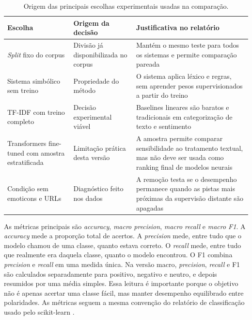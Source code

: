 \documentclass[11pt,a4paper]{article}
\newcommand{\altrowcolors}{\rowcolors{2}{black!4}{white}}
\newcommand{\clearrowcolors}{\rowcolors{2}{}{}}
\begin{document}
\begin{table}[h]
\small
\centering
\renewcommand{\arraystretch}{1.16}
\altrowcolors
\begin{tabularx}{\linewidth}{@{}L{3.1cm}L{3.2cm}Y@{}}
\toprule
\textbf{Escolha} & \textbf{Origem da decisão} & \textbf{Justificativa no relatório} \\
\midrule
\emph{Split} fixo do corpus & Divisão já disponibilizada no corpus & Mantém o mesmo teste para todos os sistemas e permite comparação pareada \citep{ribeiro2016sentibench,dror2017replicability} \\
\addlinespace[0.3em]
Sistema simbólico sem treino & Propriedade do método & O sistema aplica léxico e regras, sem aprender pesos supervisionados a partir do treino \\
\addlinespace[0.3em]
TF-IDF com treino completo & Decisão experimental viável & Baselines lineares são baratos e tradicionais em categorização de texto e sentimento \citep{salton1988termweighting,pang2002thumbs,joachims1998text} \\
\addlinespace[0.3em]
Transformers fine-tuned com amostra estratificada & Limitação prática desta versão & A amostra permite comparar sensibilidade ao tratamento textual, mas não deve ser usada como ranking final de modelos neurais \\
\addlinespace[0.3em]
Condição sem emoticons e URLs & Diagnóstico feito nos dados & A remoção testa se o desempenho permanece quando as pistas mais próximas da supervisão distante são apagadas \citep{go2009distant,gururangan2018artifacts,poliak2018hypothesis} \\
\bottomrule
\end{tabularx}
\clearrowcolors
\caption{Origem das principais escolhas experimentais usadas na comparação.}
\label{tab:decisoes}
\end{table}

As métricas principais são \emph{accuracy}, \emph{macro precision}, \emph{macro recall} e \emph{macro F1}. A \emph{accuracy} mede a proporção total de acertos. A \emph{precision} mede, entre tudo que o modelo chamou de uma classe, quanto estava correto. O \emph{recall} mede, entre tudo que realmente era daquela classe, quanto o modelo encontrou. O F1 combina \emph{precision} e \emph{recall} em uma medida única. Na versão macro, \emph{precision}, \emph{recall} e F1 são calculados separadamente para positivo, negativo e neutro, e depois resumidos por uma média simples. Essa leitura é importante porque o objetivo não é apenas acertar uma classe fácil, mas manter desempenho equilibrado entre polaridades. As métricas seguem a mesma convenção do relatório de classificação usado pelo scikit-learn \citep{pedregosa2011scikit}.
\end{document}
